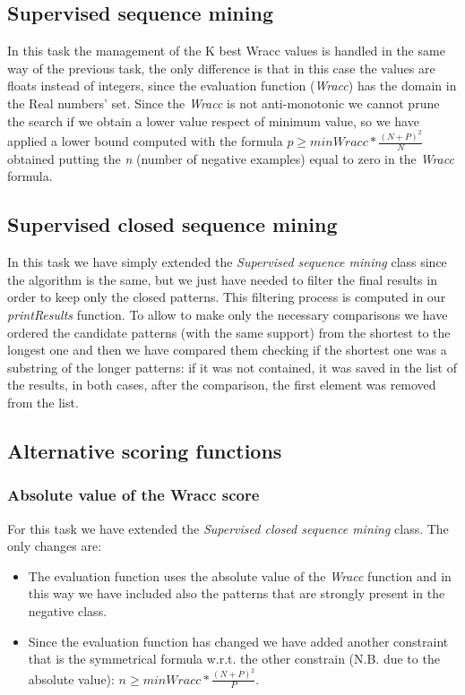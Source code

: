\documentclass[10pt, a4paper]{article}
\begin{document}
	\subsection{Supervised sequence mining}
	In this task the management of the K best Wracc values is handled in the same way of the previous task, the only difference is that in this case the values are floats instead of integers, since the evaluation function (\textit{Wracc}) has the domain in the Real numbers' set.
	Since the \textit{Wracc} is not anti-monotonic we cannot prune the search if we obtain a lower value respect of minimum value, so we have applied a lower bound computed with the formula $p\geq minWracc*\frac{(N+P)^2}{N}$ obtained putting the \textit{n} (number of negative examples) equal to zero in the \textit{Wracc} formula.
	
	\subsection{Supervised closed sequence mining}
	In this task we have simply extended the \textit{Supervised sequence mining} class since the algorithm is the same, but we just have needed to filter the final results in order to keep only the closed patterns.
	This filtering process is computed in our \textit{printResults} function. To allow to make only the necessary comparisons we have ordered the candidate patterns (with the same support) from the shortest to the longest one and then we have compared them checking if the shortest one was a substring of the longer patterns: if it was not contained, it was saved in the list of the results, in both cases, after the comparison, the first element was removed from the list.	
		
	\subsection{Alternative scoring functions}	
	\subsubsection{Absolute value of the Wracc score}	
	For this task we have extended the \textit{Supervised closed sequence mining} class. The only changes are:
	\begin{itemize}
		\item The evaluation function uses the absolute value of the \textit{Wracc} function and in this way we have included also the patterns that are strongly present in the negative class.
		\item Since the evaluation function has changed we have added another constraint that is the symmetrical formula w.r.t. the other constrain (N.B. due to the absolute value): \newline $n\geq minWracc*\frac{(N+P)^2}{P}$.
	\end{itemize}
\end{document}
